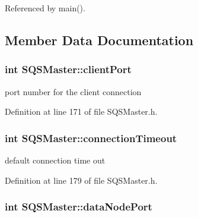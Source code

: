 \-Referenced by main().



\subsection{\-Member \-Data \-Documentation}
\hypertarget{classSQSMaster_a89e8b3c4b0da8172f5309bce3ac7dc26}{
\subsubsection[{client\-Port}]{\setlength{\rightskip}{0pt plus 5cm}int {\bf \-S\-Q\-S\-Master\-::client\-Port}}}\label{dc/d1b/classSQSMaster_a89e8b3c4b0da8172f5309bce3ac7dc26}


port number for the client connection 



\-Definition at line 171 of file \-S\-Q\-S\-Master.\-h.

\hypertarget{classSQSMaster_aec49d49c7c3301aaba049672f4a46cb9}{
\subsubsection[{connection\-Timeout}]{\setlength{\rightskip}{0pt plus 5cm}int {\bf \-S\-Q\-S\-Master\-::connection\-Timeout}}}\label{dc/d1b/classSQSMaster_aec49d49c7c3301aaba049672f4a46cb9}


default connection time out 



\-Definition at line 179 of file \-S\-Q\-S\-Master.\-h.

\hypertarget{classSQSMaster_a696a65ad732112ad27f1a1d353c3db63}{
\subsubsection[{data\-Node\-Port}]{\setlength{\rightskip}{0pt plus 5cm}int {\bf \-S\-Q\-S\-Master\-::data\-Node\-Port}}}\label{dc/d1b/classSQSMaster_a696a65ad732112ad27f1a1d353c3db63}


